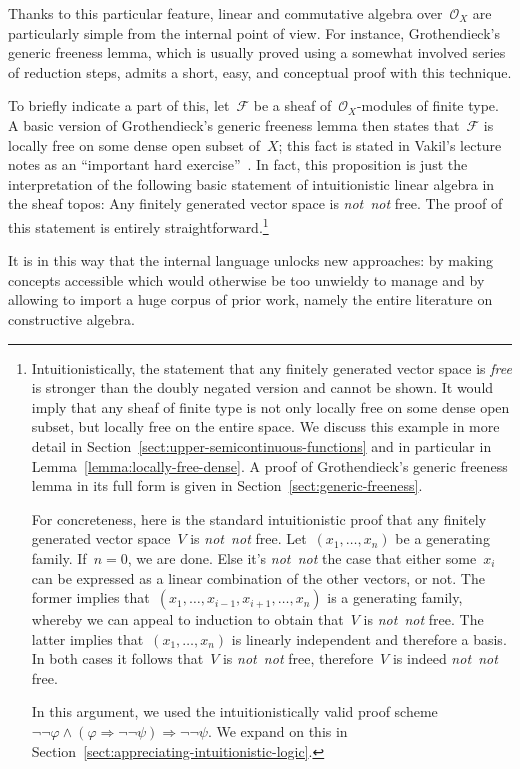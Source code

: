 \documentclass[10pt,reqno,a4paper]{amsbook}
\theoremstyle{definition}
\theoremstyle{plain}
\theoremstyle{remark}
\newcommand{\F}{\mathcal{F}}
\renewcommand{\O}{\mathcal{O}}
\newcommand{\?}{\,{:}\,}
\renewcommand{\_}{\mathpunct{.}\,}
\newcommand{\notnot}{\emph{not~not}\xspace}
\begin{document}
{Thanks to this particular feature, linear and commutative algebra over~$\O_X$
are particularly simple from the
internal point of view. For instance, Grothendieck's generic freeness lemma,
which is usually proved using a somewhat involved series of reduction steps,
admits a short, easy, and conceptual proof with this technique.

To briefly indicate a part of this, let~$\F$ be a sheaf of~$\O_X$-modules of finite
type. A basic version of Grothendieck's generic freeness lemma then states
that~$\F$ is locally free on some dense open subset of~$X$; this fact
is stated in Vakil's lecture notes as an ``important hard
exercise''~\cite[Exercise~13.7.K]{vakil:foag}. In fact, this proposition is just the
interpretation of the following basic statement of intuitionistic linear algebra in
the sheaf topos: Any finitely generated vector space is \notnot free.
The proof of this statement is entirely straightforward.\footnote{Intuitionistically,
the statement that any finitely generated vector space is \emph{free} is stronger than
the doubly negated version and cannot be shown. It would imply that any sheaf
of finite type is not only locally free on some dense open subset, but locally
free on the entire space. We discuss this example in more detail in
Section~\ref{sect:upper-semicontinuous-functions} and in particular in
Lemma~\ref{lemma:locally-free-dense}. A proof of Grothendieck's generic
freeness lemma in its full form is given in
Section~\ref{sect:generic-freeness}.

For concreteness, here is the standard intuitionistic proof that any finitely
generated vector space~$V$ is \notnot free. Let~$(x_1,\ldots,x_n)$ be a
generating family. If~$n = 0$, we are done. Else it's \notnot the case that
either some~$x_i$ can be expressed as a linear combination of the other
vectors, or not. The former implies
that~$(x_1,\ldots,x_{i-1},x_{i+1},\ldots,x_n)$ is a generating family, whereby
we can appeal to induction to obtain that~$V$ is \notnot free. The latter implies that~$(x_1,\ldots,x_n)$ is
linearly independent and therefore a basis. In both cases it follows that~$V$
is \notnot free, therefore~$V$ is indeed \notnot free.

In this argument, we used the intuitionistically valid proof
scheme~$\neg\neg\varphi \wedge (\varphi \Rightarrow \neg\neg\psi) \Longrightarrow
\neg\neg\psi$. We expand on this in
Section~\ref{sect:appreciating-intuitionistic-logic}.}

It is in this way that the internal language unlocks new approaches: by
making concepts accessible which would otherwise be too unwieldy to manage and
by allowing to import a huge corpus of prior work, namely the entire literature
on constructive algebra.

}
\end{document}
